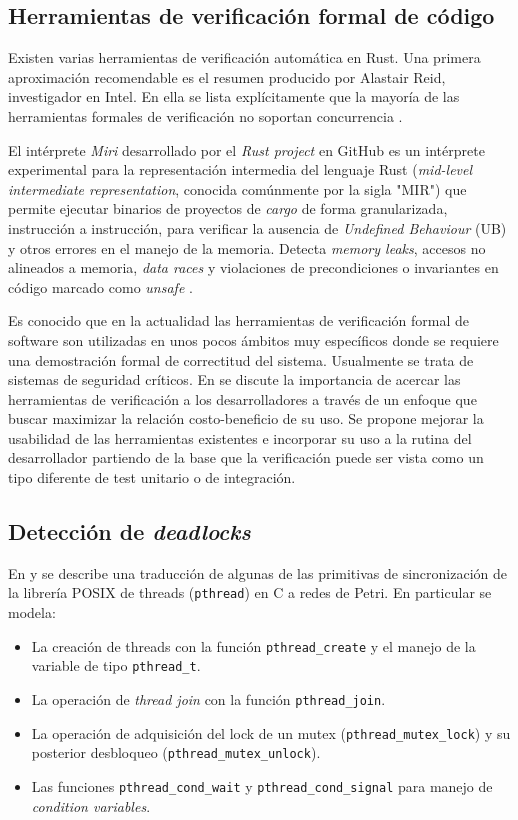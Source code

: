 \documentclass[12pt]{article}
\begin{document}
\subsection{Herramientas de verificación formal de código}

Existen varias herramientas de verificación automática en Rust.
Una primera aproximación recomendable es el resumen producido por Alastair Reid, investigador en Intel.
En ella se lista explícitamente que la mayoría de las herramientas formales de verificación no soportan concurrencia \cite{reid2021}.

El intérprete \textit{Miri} desarrollado por el \textit{Rust project} en GitHub es un intérprete experimental para la representación intermedia del lenguaje Rust
(\textit{mid-level intermediate representation}, conocida comúnmente por la sigla "MIR")
que permite ejecutar binarios de proyectos de \textit{cargo} de forma granularizada, instrucción a instrucción, para verificar la ausencia de \textit{Undefined Behaviour} (UB) y otros
errores en el manejo de la memoria.
Detecta \textit{memory leaks}, accesos no alineados a memoria, \textit{data races} y violaciones de precondiciones o invariantes en código marcado como \textit{unsafe} \cite{miri-website}.

Es conocido que en la actualidad las herramientas de verificación formal de software son utilizadas en unos pocos ámbitos muy específicos
donde se requiere una demostración formal de correctitud del sistema. Usualmente se trata de sistemas de seguridad críticos.
En \cite{reid:hatra:2020} se discute la importancia de acercar las herramientas de verificación a los desarrolladores
a través de un enfoque que buscar maximizar la relación costo-beneficio de su uso.
Se propone mejorar la usabilidad de las herramientas existentes e incorporar su uso a la rutina del desarrollador partiendo
de la base que la verificación puede ser vista como un tipo diferente de test unitario o de integración.

\subsection{Detección de \textit{deadlocks}}

En \cite{kavi-moshtaghi2002} y \cite{moshtaghi2001} se describe una traducción de algunas de las primitivas
de sincronización de la librería POSIX de threads (\texttt{pthread}) en C a redes de Petri.
En particular se modela:

\begin{itemize}
    \item La creación de threads con la función \texttt{pthread\_create} y el manejo de la variable de tipo \texttt{pthread\_t}.
    \item La operación de \textit{thread join} con la función \texttt{pthread\_join}.
    \item La operación de adquisición del lock de un mutex (\texttt{pthread\_mutex\_lock}) y su posterior desbloqueo (\texttt{pthread\_mutex\_unlock}).
    \item Las funciones \texttt{pthread\_cond\_wait} y \texttt{pthread\_cond\_signal} para manejo de \textit{condition variables}.
\end{itemize}
\end{document}
